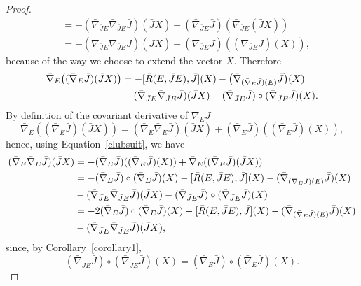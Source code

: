 \documentclass[10pt,a4paper]{amsart}
\begin{document}
\begin{proof}
\begin{align*}
&= - (\bar{\nabla}_{\bar{J}E}\bar{\nabla}_{\bar{J}E}\bar{J})(\bar{J}X)- (\bar{\nabla}_{\bar{J}E}\bar{J}) (\bar{\nabla}_{\bar{J}E}(\bar{J}X))\\
&= - (\bar{\nabla}_{\bar{J}E}\bar{\nabla}_{\bar{J}E}\bar{J})(\bar{J}X)- (\bar{\nabla}_{\bar{J}E}\bar{J})((\bar{\nabla}_{\bar{J}E}\bar{J})(X)),
\end{align*}
because of the way we choose to extend the vector $X$.
Therefore
\begin{align}  
\bar{\nabla}_E \big((\bar{\nabla}_E \bar{J}) (\bar{J}X)\big) &=-[\bar{R}(E,\bar{J}E),\bar{J}](X)-\big(\bar{\nabla}_{(\bar{\nabla}_E\bar{J})(E)}\bar{J}\big)(X)\label{clubsuit}\\
&-(\bar{\nabla}_{\bar{J}E}\bar{\nabla}_{\bar{J}E}\bar{J}) (\bar{J}X) - (\bar{\nabla}_{\bar{J}E}\bar{J})\circ(\bar{\nabla}_{\bar{J}E}\bar{J})(X)\notag.
\end{align}
By definition of the covariant derivative of $\bar{\nabla}_E \bar{J}$
$$
\bar{\nabla}_E ((\bar{\nabla}_E \bar{J}) (\bar{J}X))= (\bar{\nabla}_E
\bar{\nabla}_E \bar{J})(\bar{J}X)+(\bar{\nabla}_{E}\bar{J})(
(\bar{\nabla}_{E}\bar{J})(X)),
$$
hence, using Equation~\eqref{clubsuit}, we have
\begin{align}
(\bar{\nabla}_E \bar{\nabla}_E \bar{J})(\bar{J}X) 
&=  -(\bar{\nabla}_{E}\bar{J})((\bar{\nabla}_{E}\bar{J})(X))+\bar{\nabla}_E ((\bar{\nabla}_E \bar{J}) (\bar{J}X))\notag\\
&=  -(\bar{\nabla}_{E}\bar{J})\circ(\bar{\nabla}_{E}\bar{J})(X)-[\bar{R}(E,\bar{J}E),\bar{J}](X)-(\bar{\nabla}_{(\bar{\nabla}_E\bar{J})(E)}\bar{J})(X)\notag\\
&-(\bar{\nabla}_{\bar{J}E}\bar{\nabla}_{\bar{J}E}\bar{J}) (\bar{J}X)  - (\bar{\nabla}_{\bar{J}E}\bar{J})\circ(\bar{\nabla}_{\bar{J}E}\bar{J})(X)  \notag \\
&= -2(\bar{\nabla}_{E}\bar{J})\circ(\bar{\nabla}_{E}\bar{J})(X)-[\bar{R}(E,\bar{J}E),\bar{J}](X)-(\bar{\nabla}_{(\bar{\nabla}_E\bar{J})(E)}\bar{J})(X)\label{eqstar}\\
&-(\bar{\nabla}_{\bar{J}E}\bar{\nabla}_{\bar{J}E}\bar{J}) (\bar{J}X) ,\notag
\end{align}
since, by Corollary~\ref{corollary1},
$$(\bar{\nabla}_{\bar{J}E}\bar{J})\circ(\bar{\nabla}_{\bar{J}E}\bar{J})(X) =
(\bar{\nabla}_{E}\bar{J})\circ(\bar{\nabla}_{E}\bar{J})(X).$$ 

\end{proof}
\end{document}
